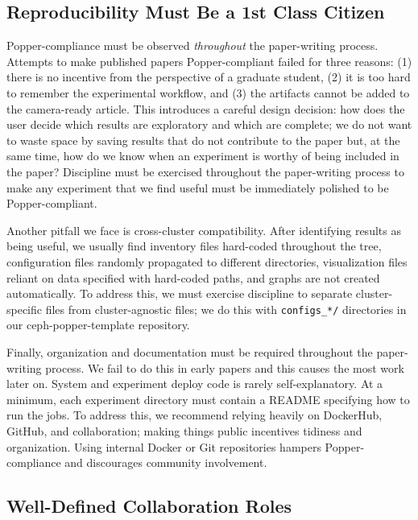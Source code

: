 \subsection{Reproducibility Must Be a 1st Class Citizen}

Popper-compliance must be observed {\it throughout} the paper-writing process.
Attempts to make published papers Popper-compliant failed for three reasons:
(1) there is no incentive from the perspective of a graduate student, (2) it is
too hard to remember the experimental workflow, and (3) the artifacts cannot be
added to the camera-ready article. This introduces a careful design decision:
how does the user decide which results are exploratory and which are complete;
we do not want to waste space by saving results that do not contribute to the
paper but, at the same time, how do we know when an experiment is worthy of
being included in the paper? Discipline must be exercised throughout the paper-writing
process to make any experiment that we find useful must be immediately polished
to be Popper-compliant.

Another pitfall we face is cross-cluster compatibility. After identifying
results as being useful, we usually find inventory files hard-coded throughout
the tree, configuration files randomly propagated to different directories,
visualization files reliant on data specified with hard-coded paths, and graphs
are not created automatically. To address this, we must exercise discipline to
separate cluster-specific files from cluster-agnostic files; we do this with
\texttt{configs\_*/} directories in our ceph-popper-template repository.

Finally, organization and documentation must be required throughout the
paper-writing process. We fail to do this in early papers and this causes the
most work later on. System and experiment deploy code is rarely
self-explanatory. At a minimum, each experiment directory must contain a README
specifying how to run the jobs. To address this, we recommend relying heavily
on DockerHub, GitHub, and collaboration; making things public incentives
tidiness and organization. Using internal Docker or Git repositories hampers
Popper-compliance and discourages community involvement.

\subsection{Well-Defined Collaboration Roles}

